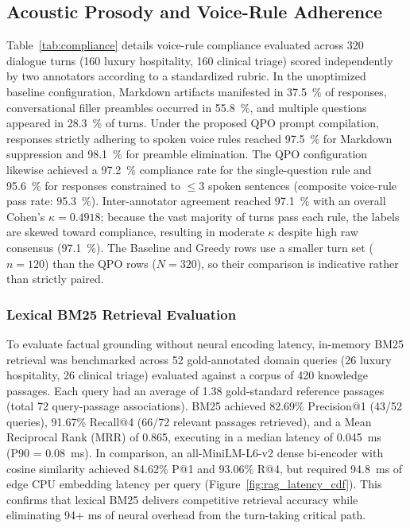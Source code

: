 \documentclass[review,12pt,times,authoryear]{elsarticle}
\theoremstyle{definition}
\begin{document}
\subsection{Acoustic Prosody and Voice-Rule Adherence}
Table~\ref{tab:compliance} details voice-rule compliance evaluated across 320 dialogue turns (160 luxury hospitality, 160 clinical triage) scored independently by two annotators according to a standardized rubric. In the unoptimized baseline configuration, Markdown artifacts manifested in \SI{37.5}{\percent} of responses, conversational filler preambles occurred in \SI{55.8}{\percent}, and multiple questions appeared in \SI{28.3}{\percent} of turns. Under the proposed QPO prompt compilation, responses strictly adhering to spoken voice rules reached \SI{97.5}{\percent} for Markdown suppression and \SI{98.1}{\percent} for preamble elimination. The QPO configuration likewise achieved a \SI{97.2}{\percent} compliance rate for the single-question rule and \SI{95.6}{\percent} for responses constrained to $\le 3$ spoken sentences (composite voice-rule pass rate: \SI{95.3}{\percent}). Inter-annotator agreement reached \SI{97.1}{\percent} with an overall Cohen's $\kappa = 0.4918$; because the vast majority of turns pass each rule, the labels are skewed toward compliance, resulting in moderate $\kappa$ despite high raw consensus (\SI{97.1}{\percent}). The Baseline and Greedy rows use a smaller turn set ($n=120$) than the QPO rows ($N=320$), so their comparison is indicative rather than strictly paired.

\subsubsection*{Lexical BM25 Retrieval Evaluation}
To evaluate factual grounding without neural encoding latency, in-memory BM25 retrieval was benchmarked across 52 gold-annotated domain queries (26 luxury hospitality, 26 clinical triage) evaluated against a corpus of 420 knowledge passages. Each query had an average of 1.38 gold-standard reference passages (total 72 query-passage associations). BM25 achieved 82.69\% Precision@1 (43/52 queries), 91.67\% Recall@4 (66/72 relevant passages retrieved), and a Mean Reciprocal Rank (MRR) of 0.865, executing in a median latency of \SI{0.045}{\milli\second} (P90 = \SI{0.08}{\milli\second}). In comparison, an all-MiniLM-L6-v2 dense bi-encoder with cosine similarity achieved 84.62\% P@1 and 93.06\% R@4, but required \SI{94.8}{\milli\second} of edge CPU embedding latency per query (Figure~\ref{fig:rag_latency_cdf}). This confirms that lexical BM25 delivers competitive retrieval accuracy while eliminating 94+ ms of neural overhead from the turn-taking critical path.
\end{document}

